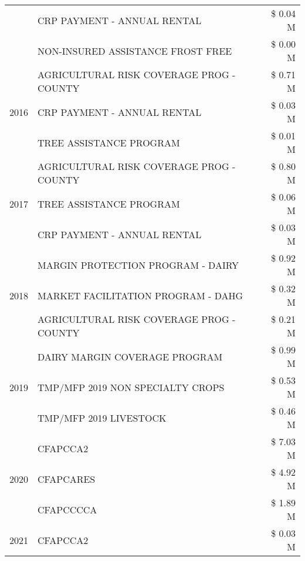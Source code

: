 \begin{tabular}{llr}
 & CRP PAYMENT - ANNUAL RENTAL & \$ 0.04 M \\
 & NON-INSURED ASSISTANCE FROST FREE & \$ 0.00 M \\
\cline{1-3}
\multirow[t]{3}{*}{2016} & AGRICULTURAL RISK COVERAGE PROG - COUNTY & \$ 0.71 M \\
 & CRP PAYMENT - ANNUAL RENTAL & \$ 0.03 M \\
 & TREE ASSISTANCE PROGRAM & \$ 0.01 M \\
\cline{1-3}
\multirow[t]{3}{*}{2017} & AGRICULTURAL RISK COVERAGE PROG - COUNTY & \$ 0.80 M \\
 & TREE ASSISTANCE PROGRAM & \$ 0.06 M \\
 & CRP PAYMENT - ANNUAL RENTAL & \$ 0.03 M \\
\cline{1-3}
\multirow[t]{3}{*}{2018} & MARGIN PROTECTION PROGRAM - DAIRY & \$ 0.92 M \\
 & MARKET FACILITATION PROGRAM - DAHG & \$ 0.32 M \\
 & AGRICULTURAL RISK COVERAGE PROG - COUNTY & \$ 0.21 M \\
\cline{1-3}
\multirow[t]{3}{*}{2019} & DAIRY MARGIN COVERAGE PROGRAM & \$ 0.99 M \\
 & TMP/MFP 2019 NON SPECIALTY CROPS & \$ 0.53 M \\
 & TMP/MFP 2019 LIVESTOCK & \$ 0.46 M \\
\cline{1-3}
\multirow[t]{3}{*}{2020} & CFAPCCA2 & \$ 7.03 M \\
 & CFAPCARES & \$ 4.92 M \\
 & CFAPCCCCA & \$ 1.89 M \\
\cline{1-3}
2021 & CFAPCCA2 & \$ 0.03 M \\
\cline{1-3}
\bottomrule
\end{tabular}
